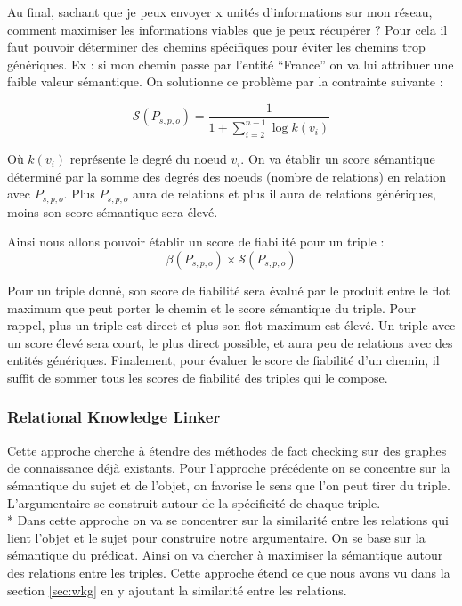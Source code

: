 Au final, sachant que je peux envoyer x unités d'informations sur mon réseau, comment maximiser les informations viables que je peux récupérer ? Pour cela il faut pouvoir déterminer des chemins spécifiques pour éviter les chemins trop génériques. Ex : si mon chemin passe par l'entité \enquote{France} on va lui attribuer une faible valeur sémantique. On solutionne ce problème par la contrainte suivante :

\begin{equation}
   \mathcal{S}(P_{s,p,o}) = \frac{1}{1 + \sum\limits_{i=2}^{n-1} \log k(v_{i})}
\end{equation}

Où $ k(v_{i}) $ représente le degré du noeud $ v_{i} $. On va établir un score sémantique déterminé par la somme des degrés des noeuds (nombre de relations) en relation avec $ P_{s,p,o} $. Plus $ P_{s,p,o} $ aura de relations et plus il aura de relations génériques, moins son score sémantique sera élevé.

Ainsi nous allons pouvoir établir un score de fiabilité pour un triple :
\begin{equation}
   \beta(P_{s,p,o}) \times \mathcal{S}(P_{s,p,o})
\end{equation}

Pour un triple donné, son score de fiabilité sera évalué par le produit entre le flot maximum que peut porter le chemin et le score sémantique du triple. Pour rappel, plus un triple est direct et plus son flot maximum est élevé. Un triple avec un score élevé sera court, le plus direct possible, et aura peu de relations avec des entités génériques. Finalement, pour évaluer le score de fiabilité d'un chemin, il suffit de sommer tous les scores de fiabilité des triples qui le compose.

\subsubsection{Relational Knowledge Linker}

Cette approche cherche à étendre des méthodes de fact checking sur des graphes de connaissance déjà existants.
Pour l'approche précédente on se concentre sur la sémantique du sujet et de l'objet, on favorise le sens que l'on peut tirer du triple. L'argumentaire se construit autour de la spécificité de chaque triple.
\\*
Dans cette approche on va se concentrer sur la similarité entre les relations qui lient l'objet et le sujet pour construire notre argumentaire. On se base sur la sémantique du prédicat. Ainsi on va chercher à maximiser la sémantique autour des relations entre les triples. Cette approche étend ce que nous avons vu dans la section \ref{sec:wkg} en y ajoutant la similarité entre les relations.

